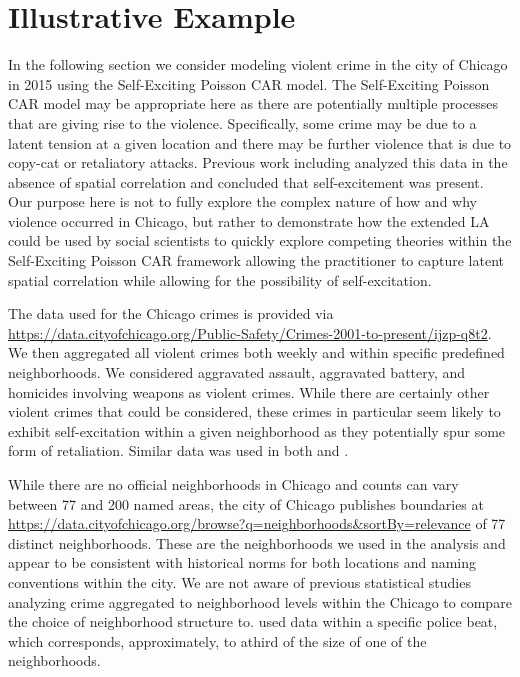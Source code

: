 \documentclass[11pt]{isuthesis}
\begin{document}
	\section{Illustrative Example}
	
	In the following section we consider modeling violent crime in the city of Chicago in 2015 using the Self-Exciting Poisson CAR model.  The Self-Exciting Poisson CAR model may be appropriate here as there are potentially multiple processes that are giving rise to the violence.  Specifically, some crime may be due to a latent tension at a given location and there may be further violence that is due to copy-cat or retaliatory attacks.  Previous work including \cite{mohler2013modeling} analyzed this data in the absence of spatial correlation and concluded that self-excitement was present.  Our purpose here is not to fully explore the complex nature of how and why violence occurred in Chicago, but rather to demonstrate how the extended LA could be used by social scientists to quickly explore competing theories within the Self-Exciting Poisson CAR framework allowing the practitioner to capture latent spatial correlation while allowing for the possibility of self-excitation.
	
	The data used for the Chicago crimes is provided via \url{https://data.cityofchicago.org/Public-Safety/Crimes-2001-to-present/ijzp-q8t2}.  We then aggregated all violent crimes both weekly and within specific predefined neighborhoods.  We considered aggravated assault, aggravated battery, and homicides involving weapons as violent crimes.  While there are certainly other violent crimes that could be considered, these crimes in particular seem likely to exhibit self-excitation within a given neighborhood as they potentially spur some form of retaliation.  Similar data was used in both \cite{mohler2013modeling} and \cite{mohler2014marked}. 
	
	While there are no official neighborhoods in Chicago and counts can vary between 77 and 200 named areas, the city of Chicago publishes boundaries at \url{https://data.cityofchicago.org/browse?q=neighborhoods&sortBy=relevance} of 77 distinct neighborhoods.  These are the neighborhoods we used in the analysis and appear to be consistent with historical norms for both locations and naming conventions within the city.  We are not aware of previous statistical studies analyzing crime aggregated to neighborhood levels within the Chicago to compare the choice of neighborhood structure to.  \cite{mohler2013modeling} used data within a specific police beat, which corresponds, approximately, to athird of the size of one of the neighborhoods.
	
\end{document}
